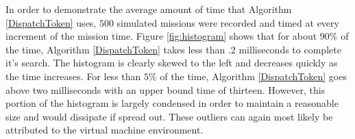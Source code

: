 In order to demonstrate the average amount of time that Algorithm
\ref{DispatchToken} uses, $500$ simulated missions were recorded and timed
at every increment of the mission time. Figure \ref{fig:histogram} shows that for about
$90\%$ of the time, Algorithm \ref{DispatchToken} takes less than $.2$
milliseconds to complete it's search. The histogram is clearly skewed
to the left and decreases quickly as the time increases.  For less than $5\%$
of the time, Algorithm \ref{DispatchToken} goes above two
milliseconds with an upper bound time of thirteen. However, this
portion of the histogram is largely condensed in order to maintain a
reasonable size and would dissipate if spread out. These outliers can again 
most likely be attributed to the virtual machine environment.

